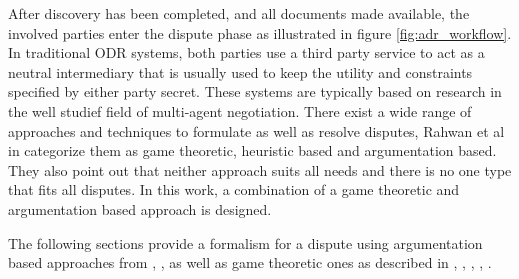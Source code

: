\documentclass[12pt,msc,a4paper,oneside]{ucl_thesis}
\begin{document}
After discovery has been completed, and all documents made available, the involved parties enter the dispute phase as illustrated in figure \ref{fig:adr_workflow}. In traditional ODR systems, both parties use a third party service to act as a neutral intermediary that is usually used to keep the utility and constraints specified by either party secret. These systems are typically based on research in the well studief field of multi-agent negotiation. There exist a wide range of approaches and techniques to formulate as well as resolve disputes, Rahwan et al in \cite{Rahwan:2003:AN:1030328.1030332} categorize them as game theoretic, heuristic based and argumentation based. They also point out that neither approach suits all needs and there is no one type that fits all disputes. In this work, a combination of a game theoretic and argumentation based approach is designed. 

The following sections provide a formalism for a dispute using argumentation based approaches from \cite{Lodder:ORD_system_design}, \cite{Bellucci:2004:IAI:1032651.1033678}, \cite{Rahwan:2003:AN:1030328.1030332} as well as game theoretic ones as described in \cite{Susskind:Logic_of_mediating_values}, \cite{Ragone:2006:PAO:1124566.1124569}, \cite{Ragone2008}, \cite{Wooldridge:2000:LN:3006433.3006516}, \cite{Chevaleyre:2005:NOS:1082473.1082518}.
\end{document}
